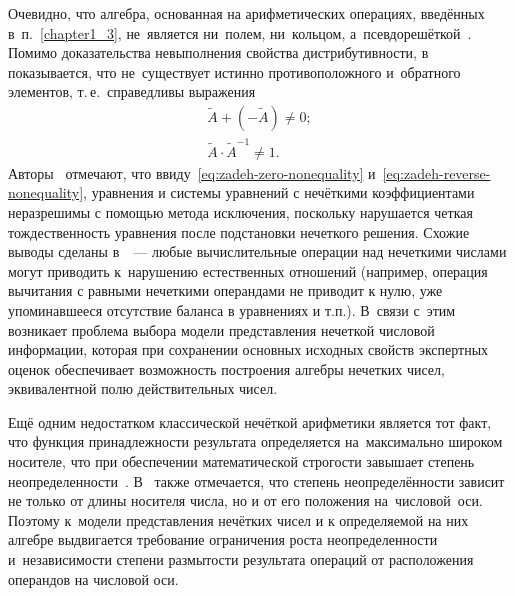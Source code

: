 Очевидно, что алгебра, основанная на арифметических операциях, введённых в~п.~\ref{chapter1_3}, не~является ни~полем, ни~кольцом, а~псевдорешёткой~\cite{Kaufmann}. Помимо доказательства невыполнения свойства дистрибутивности, в~\cite{Pospelov, Borisov_Alexeev_Msk, Yakhyaeva, Yager_Arithmetics} показывается, что не~существует истинно противоположного и~обратного элементов, т.\,е.~справедливы выражения
\begin{gather}
	\label{eq:zadeh-zero-nonequality}
	\tilde{A}+\left( -\tilde{A} \right)\ne 0; \\
	\label{eq:zadeh-reverse-nonequality}
	\tilde{A}\cdot {{\tilde{A}}^{-1}}\ne 1.
\end{gather}
Авторы~\cite{Rutkovskaya} отмечают, что ввиду~\eqref{eq:zadeh-zero-nonequality} и~\eqref{eq:zadeh-reverse-nonequality}, уравнения и системы уравнений с нечёткими коэффициентами неразрешимы с помощью метода исключения, поскольку нарушается четкая тождественность уравнения после подстановки нечеткого решения. Схожие выводы сделаны в~\cite{Sokolov}~--- любые вычислительные операции над нечеткими числами могут приводить к~нарушению естественных отношений (например, операция вычитания с равными нечеткими операндами не приводит к нулю, уже упоминавшееся отсутствие баланса в уравнениях и т.п.). В~связи с~этим возникает проблема выбора модели представления нечеткой числовой информации, которая при сохранении основных исходных свойств экспертных оценок обеспечивает возможность построения алгебры нечетких чисел, эквивалентной полю действительных чисел. 

Ещё одним недостатком классической нечёткой арифметики является тот факт, что функция принадлежности результата определяется на~максимально широком носителе, что при обеспечении математической строгости завышает степень неопределенности~\cite{Evdokimov}. В~\cite{Yakhyaeva} также отмечается, что степень неопределённости зависит не только от длины носителя числа, но и от его положения на~числовой~оси. Поэтому к~модели представления нечётких чисел и к определяемой на них алгебре выдвигается требование ограничения роста неопределенности и~независимости степени размытости результата операций от расположения операндов на числовой оси.

